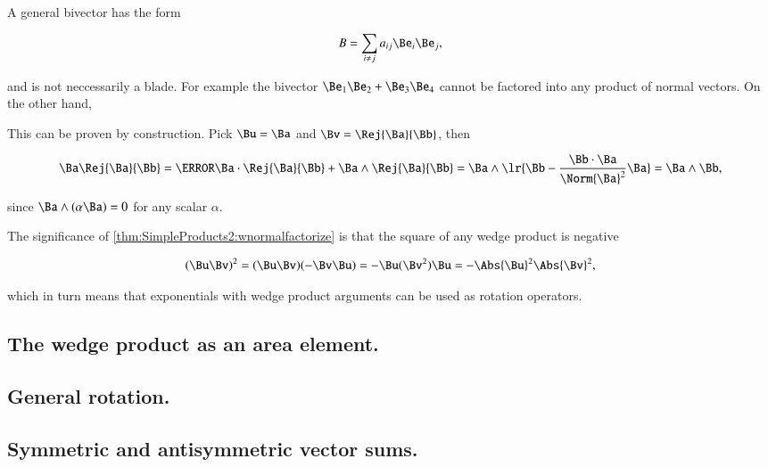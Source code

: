 A general bivector has the form

\begin{dmath}\label{eqn:SimpleProducts2:1800}
B = \sum_{i \ne j} a_{ij} \Be_i \Be_j,
\end{dmath}

and is not neccessarily a blade.  For example the bivector \( \Be_1 \Be_2 + \Be_3 \Be_4 \) cannot be factored into any product of normal vectors.
On the other hand,


This can be proven by construction.  Pick \( \Bu = \Ba \) and \( \Bv = \Rej{\Ba}{\Bb} \), then

\begin{dmath}\label{eqn:SimpleProducts2:1840}
\Ba \Rej{\Ba}{\Bb}
=
\cancel{\Ba \cdot \Rej{\Ba}{\Bb}}
+
\Ba \wedge \Rej{\Ba}{\Bb}
=
\Ba \wedge \lr{ \Bb - \frac{\Bb \cdot \Ba}{\Norm{\Ba}^2} \Ba }
=
\Ba \wedge \Bb,
\end{dmath}

since \( \Ba \wedge (\alpha \Ba) = 0 \) for any scalar \( \alpha \).

The significance of \cref{thm:SimpleProducts2:wnormalfactorize} is that the square of any wedge product is negative

\begin{dmath}\label{eqn:SimpleProducts2:1820}
(\Bu \Bv)^2
=
(\Bu \Bv) (-\Bv \Bu)
=
-\Bu (\Bv^2) \Bu
=
- \Abs{\Bu}^2 \Abs{\Bv}^2,
\end{dmath}

which in turn means that exponentials with wedge product arguments can be used as rotation operators.


\subsection{The wedge product as an area element.}


\subsection{General rotation.}


\subsection{Symmetric and antisymmetric vector sums.}
